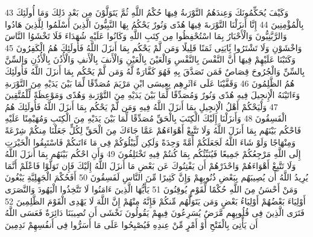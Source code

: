 \documentclass[20pt,a4paper]{article}
\begin{document}
{\tiny\colorbox{cl_aya}{43}} وَكَيْفَ يُحَكِّمُونَكَ وَعِندَهُمُ التَّوْرَىةُ فِيهَا حُكْمُ اللَّهِ ثُمَّ يَتَوَلَّوْنَ مِن بَعْدِ ذَلِكَ وَمَا أُولَئِكَ بِالْمُؤْمِنِينَ
{\tiny\colorbox{cl_aya}{44}} إِنَّا أَنزَلْنَا التَّوْرَىةَ فِيهَا هُدًى وَنُورٌ يَحْكُمُ بِهَا النَّبِيُّونَ الَّذِينَ أَسْلَمُوا لِلَّذِينَ هَادُوا وَالرَّبَّنِيُّونَ وَالْأَحْبَارُ بِمَا اسْتُحْفِظُوا مِن كِتَبِ اللَّهِ وَكَانُوا عَلَيْهِ شُهَدَاءَ فَلَا تَخْشَوُا النَّاسَ وَاخْشَوْنِ وَلَا تَشْتَرُوا بَِٔايَتِى ثَمَنًا قَلِيلًا وَمَن لَّمْ يَحْكُم بِمَا أَنزَلَ اللَّهُ فَأُولَئِكَ هُمُ الْكَفِرُونَ
{\tiny\colorbox{cl_aya}{45}} وَكَتَبْنَا عَلَيْهِمْ فِيهَا أَنَّ النَّفْسَ بِالنَّفْسِ وَالْعَيْنَ بِالْعَيْنِ وَالْأَنفَ بِالْأَنفِ وَالْأُذُنَ بِالْأُذُنِ وَالسِّنَّ بِالسِّنِّ وَالْجُرُوحَ قِصَاصٌ فَمَن تَصَدَّقَ بِهِ فَهُوَ كَفَّارَةٌ لَّهُ وَمَن لَّمْ يَحْكُم بِمَا أَنزَلَ اللَّهُ فَأُولَئِكَ هُمُ الظَّلِمُونَ
{\tiny\colorbox{cl_aya}{46}} وَقَفَّيْنَا عَلَى ءَاثَرِهِم بِعِيسَى ابْنِ مَرْيَمَ مُصَدِّقًا لِّمَا بَيْنَ يَدَيْهِ مِنَ التَّوْرَىةِ وَءَاتَيْنَهُ الْإِنجِيلَ فِيهِ هُدًى وَنُورٌ وَمُصَدِّقًا لِّمَا بَيْنَ يَدَيْهِ مِنَ التَّوْرَىةِ وَهُدًى وَمَوْعِظَةً لِّلْمُتَّقِينَ
{\tiny\colorbox{cl_aya}{47}} وَلْيَحْكُمْ أَهْلُ الْإِنجِيلِ بِمَا أَنزَلَ اللَّهُ فِيهِ وَمَن لَّمْ يَحْكُم بِمَا أَنزَلَ اللَّهُ فَأُولَئِكَ هُمُ الْفَسِقُونَ
{\tiny\colorbox{cl_aya}{48}} وَأَنزَلْنَا إِلَيْكَ الْكِتَبَ بِالْحَقِّ مُصَدِّقًا لِّمَا بَيْنَ يَدَيْهِ مِنَ الْكِتَبِ وَمُهَيْمِنًا عَلَيْهِ فَاحْكُم بَيْنَهُم بِمَا أَنزَلَ اللَّهُ وَلَا تَتَّبِعْ أَهْوَاءَهُمْ عَمَّا جَاءَكَ مِنَ الْحَقِّ لِكُلٍّ جَعَلْنَا مِنكُمْ شِرْعَةً وَمِنْهَاجًا وَلَوْ شَاءَ اللَّهُ لَجَعَلَكُمْ أُمَّةً وَحِدَةً وَلَكِن لِّيَبْلُوَكُمْ فِى مَا ءَاتَىكُمْ فَاسْتَبِقُوا الْخَيْرَتِ إِلَى اللَّهِ مَرْجِعُكُمْ جَمِيعًا فَيُنَبِّئُكُم بِمَا كُنتُمْ فِيهِ تَخْتَلِفُونَ
{\tiny\colorbox{cl_aya}{49}} وَأَنِ احْكُم بَيْنَهُم بِمَا أَنزَلَ اللَّهُ وَلَا تَتَّبِعْ أَهْوَاءَهُمْ وَاحْذَرْهُمْ أَن يَفْتِنُوكَ عَن بَعْضِ مَا أَنزَلَ اللَّهُ إِلَيْكَ فَإِن تَوَلَّوْا فَاعْلَمْ أَنَّمَا يُرِيدُ اللَّهُ أَن يُصِيبَهُم بِبَعْضِ ذُنُوبِهِمْ وَإِنَّ كَثِيرًا مِّنَ النَّاسِ لَفَسِقُونَ
{\tiny\colorbox{cl_aya}{50}} أَفَحُكْمَ الْجَهِلِيَّةِ يَبْغُونَ وَمَنْ أَحْسَنُ مِنَ اللَّهِ حُكْمًا لِّقَوْمٍ يُوقِنُونَ
{\tiny\colorbox{cl_aya}{51}} يَأَيُّهَا الَّذِينَ ءَامَنُوا لَا تَتَّخِذُوا الْيَهُودَ وَالنَّصَرَى أَوْلِيَاءَ بَعْضُهُمْ أَوْلِيَاءُ بَعْضٍ وَمَن يَتَوَلَّهُم مِّنكُمْ فَإِنَّهُ مِنْهُمْ إِنَّ اللَّهَ لَا يَهْدِى الْقَوْمَ الظَّلِمِينَ
{\tiny\colorbox{cl_aya}{52}} فَتَرَى الَّذِينَ فِى قُلُوبِهِم مَّرَضٌ يُسَرِعُونَ فِيهِمْ يَقُولُونَ نَخْشَى أَن تُصِيبَنَا دَائِرَةٌ فَعَسَى اللَّهُ أَن يَأْتِىَ بِالْفَتْحِ أَوْ أَمْرٍ مِّنْ عِندِهِ فَيُصْبِحُوا عَلَى مَا أَسَرُّوا فِى أَنفُسِهِمْ نَدِمِينَ
\end{document}
